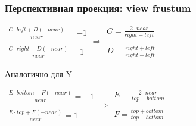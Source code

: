 \documentclass{beamer}
\begin{document}
\begin{frame}[fragile]
\frametitle{Перспективная проекция: view frustum}
\begin{center}
\begin{math}
\begin{matrix}
\frac{C\cdot left + D(-near)}{near} = -1 \\ \\
\frac{C\cdot right + D(-near)}{near} = 1
\end{matrix}
\Rightarrow
\begin{matrix}
C = \frac{2\cdot near}{right - left} \\ \\
D = \frac{right + left}{right - left}
\end{matrix}
\end{math}
\end{center}
\pause
Аналогично для Y
\begin{center}
\begin{math}
\begin{matrix}
\frac{E\cdot bottom + F(-near)}{near} = -1 \\ \\
\frac{E\cdot top + F(-near)}{near} = 1
\end{matrix}
\Rightarrow
\begin{matrix}
E = \frac{2\cdot near}{top - bottom} \\ \\
F = \frac{top + bottom}{top - bottom}
\end{matrix}
\end{math}
\end{center}
\end{frame}
\end{document}
